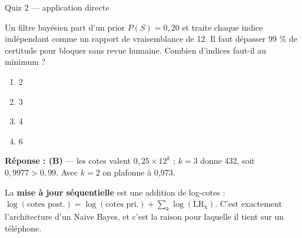 \begin{frame}{Quiz 2 — application directe}
\begin{qbox}
Un filtre bayésien part d'un prior $P(S) = 0{,}20$ et traite chaque indice
indépendant comme un rapport de vraisemblance de 12.
\vspace{2mm}
Il faut dépasser 99 \% de certitude pour bloquer sans revue humaine.
Combien d'indices faut-il au minimum ?
\vspace{2mm}
\begin{enumerate}
  \item[(A)] 2 \quad \item[(B)] 3 \quad \item[(C)] 4 \quad \item[(D)] 6
\end{enumerate}
\vspace{2mm}
\textbf{Réponse : (B)} --- les cotes valent $0{,}25 \times 12^k$ ;
$k = 3$ donne 432, soit $0{,}9977 > 0{,}99$. Avec $k = 2$ on plafonne à 0,973.
\end{qbox}
\vspace{1.5mm}
\begin{kbox}
La \textbf{mise à jour séquentielle} est une addition de log-cotes :
$\log(\text{cotes post.}) = \log(\text{cotes pri.}) + \sum_k \log(\text{LR}_k)$.
C'est exactement l'architecture d'un Naive Bayes, et c'est la raison pour laquelle
il tient sur un téléphone.
\end{kbox}
\end{frame}

